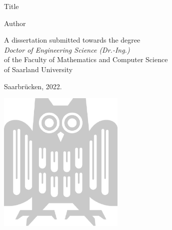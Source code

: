 \begin{titlepage}
\begin{center}
	\vspace*{2em}
	\huge{Title}
	\vspace*{0.75em}
	
	\LARGE{Author}
	\vspace*{2.5em}
	
	
	{\Large
	A dissertation submitted towards the degree\\[4px]
	\emph{Doctor of Engineering Science (Dr.-Ing.)}\\[6px]
	of the Faculty of Mathematics and Computer Science\\ 
	of Saarland University
	\vspace*{2.5em}
	
	Saarbr\"ucken, 2022.
	}
	\vspace*{2em}
	
	
	\includegraphics[width=6cm]{uds.png}
\end{center}


\end{titlepage}
